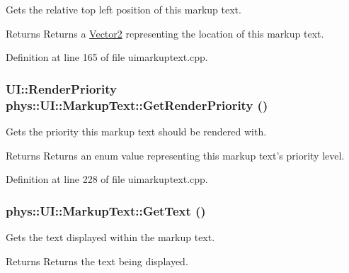 Gets the relative top left position of this markup text. 

\begin{DoxyReturn}{Returns}
Returns a \hyperlink{classphys_1_1Vector2}{Vector2} representing the location of this markup text. 
\end{DoxyReturn}


Definition at line 165 of file uimarkuptext.cpp.

\hypertarget{classphys_1_1UI_1_1MarkupText_a86afb23309534d86ed9675170b321874}{
\subsubsection[{GetRenderPriority}]{\setlength{\rightskip}{0pt plus 5cm}UI::RenderPriority phys::UI::MarkupText::GetRenderPriority ()}}
\label{d7/d23/classphys_1_1UI_1_1MarkupText_a86afb23309534d86ed9675170b321874}


Gets the priority this markup text should be rendered with. 

\begin{DoxyReturn}{Returns}
Returns an enum value representing this markup text's priority level. 
\end{DoxyReturn}


Definition at line 228 of file uimarkuptext.cpp.

\hypertarget{classphys_1_1UI_1_1MarkupText_af5d8a7e6ca03e15fc488608c28a54c1e}{
\subsubsection[{GetText}]{ phys::UI::MarkupText::GetText ()}}
\label{d7/d23/classphys_1_1UI_1_1MarkupText_af5d8a7e6ca03e15fc488608c28a54c1e}


Gets the text displayed within the markup text. 

\begin{DoxyReturn}{Returns}
Returns the text being displayed. 
\end{DoxyReturn}


